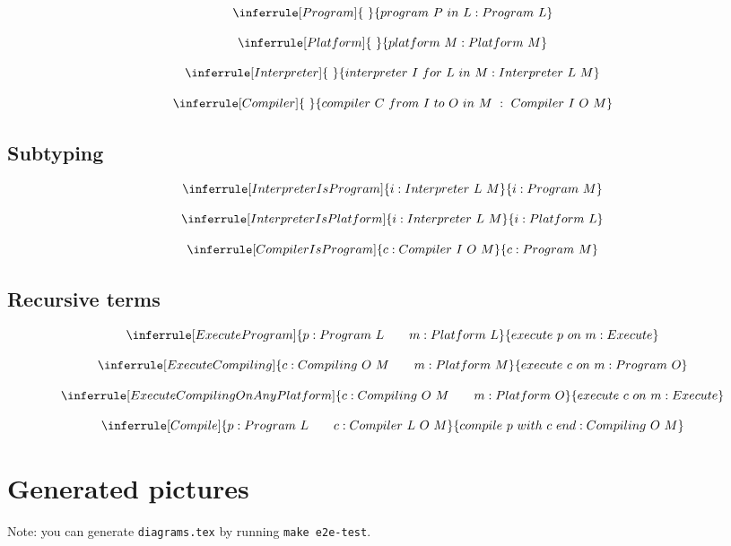 \documentclass{article}
\begin{document}
\[
\inferrule[Program]{\ }{program\ P\ in\ L : Program\ L}
\]

\[
\inferrule[Platform]{\ }{platform\ M : Platform\ M}
\]

\[
\inferrule[Interpreter]{\ }{interpreter\ I\ for\ L\ in\ M : Interpreter\ L\ M}
\]

\[
\inferrule[Compiler]{\ }{compiler\ C\ from\ I\ to\ O\ in\ M\ :\ Compiler\ I\ O\ M}
\]

\subsection*{Subtyping}

\[
\inferrule[InterpreterIsProgram]{i : Interpreter\ L\ M}{i : Program\ M}
\]

\[
\inferrule[InterpreterIsPlatform]{i : Interpreter\ L\ M}{i : Platform\ L}
\]

\[
\inferrule[CompilerIsProgram]{c : Compiler\ I\ O\ M}{c : Program\ M}
\]

\subsection*{Recursive terms}

\[
\inferrule[ExecuteProgram]{p : Program\ L \qquad m : Platform\ L}{execute\ p\ on\ m : Execute}
\]

\[
\inferrule[ExecuteCompiling]{c : Compiling\ O\ M \qquad m : Platform\ M}{execute\ c\ on\ m : Program\ O}
\]

\[
\inferrule[ExecuteCompilingOnAnyPlatform]{c : Compiling\ O\ M \qquad m : Platform\ O}{execute\ c\ on\ m : Execute}
\]

\[
\inferrule[Compile]{p : Program\ L \qquad c : Compiler\ L\ O\ M}{compile\ p\ with\ c\ end : Compiling\ O\ M}
\]

\section{Generated pictures}

Note: you can generate \texttt{diagrams.tex} by running \texttt{make e2e-test}.

\begin{scriptsize}

\end{scriptsize}
\end{document}
